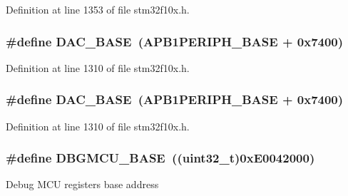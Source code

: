 Definition at line 1353 of file stm32f10x.\+h.

\subsubsection[{\texorpdfstring{D\+A\+C\+\_\+\+B\+A\+SE}{DAC_BASE}}]{\setlength{\rightskip}{0pt plus 5cm}\#define D\+A\+C\+\_\+\+B\+A\+SE~({\bf A\+P\+B1\+P\+E\+R\+I\+P\+H\+\_\+\+B\+A\+SE} + 0x7400)}\hypertarget{group___peripheral__memory__map_gad18d0b914c7f68cecbee1a2d23a67d38}{}\label{group___peripheral__memory__map_gad18d0b914c7f68cecbee1a2d23a67d38}


Definition at line 1310 of file stm32f10x.\+h.

\subsubsection[{\texorpdfstring{D\+A\+C\+\_\+\+B\+A\+SE}{DAC_BASE}}]{\setlength{\rightskip}{0pt plus 5cm}\#define D\+A\+C\+\_\+\+B\+A\+SE~({\bf A\+P\+B1\+P\+E\+R\+I\+P\+H\+\_\+\+B\+A\+SE} + 0x7400)}\hypertarget{group___peripheral__memory__map_gad18d0b914c7f68cecbee1a2d23a67d38}{}\label{group___peripheral__memory__map_gad18d0b914c7f68cecbee1a2d23a67d38}


Definition at line 1310 of file stm32f10x.\+h.

\subsubsection[{\texorpdfstring{D\+B\+G\+M\+C\+U\+\_\+\+B\+A\+SE}{DBGMCU_BASE}}]{\setlength{\rightskip}{0pt plus 5cm}\#define D\+B\+G\+M\+C\+U\+\_\+\+B\+A\+SE~(({\bf uint32\+\_\+t})0x\+E0042000)}\hypertarget{group___peripheral__memory__map_ga4adaf4fd82ccc3a538f1f27a70cdbbef}{}\label{group___peripheral__memory__map_ga4adaf4fd82ccc3a538f1f27a70cdbbef}
Debug M\+CU registers base address 

